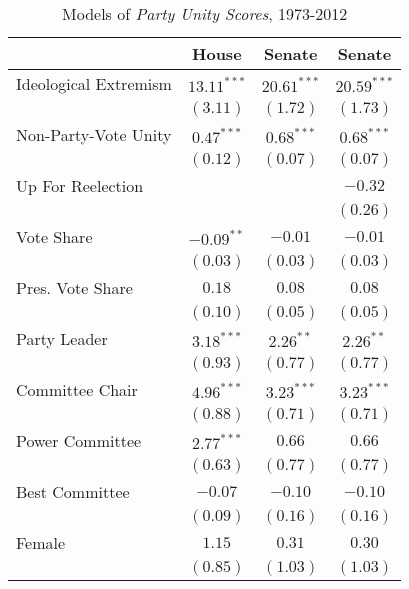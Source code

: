 \documentclass[12pt]{article}
\begin{document}
\begin{table}[!htbp]
\centering
\begin{threeparttable}
\caption{Models of \textit{Party Unity Scores}, 1973-2012}
\label{tab-party-unity-regressions}
\singlespacing
\begin{tabular}{l c c c }
\hline
& House & Senate & Senate \\
\hline
Ideological Extremism & $13.11^{***}$ & $20.61^{***}$ & $20.59^{***}$ \\
                      & $(3.11)$      & $(1.72)$      & $(1.73)$      \\
Non-Party-Vote Unity  & $0.47^{***}$  & $0.68^{***}$  & $0.68^{***}$  \\
                      & $(0.12)$      & $(0.07)$      & $(0.07)$      \\
Up For Reelection     &               &               & $-0.32$       \\
                      &               &               & $(0.26)$      \\
Vote Share            & $-0.09^{**}$  & $-0.01$       & $-0.01$       \\
                      & $(0.03)$      & $(0.03)$      & $(0.03)$      \\
Pres. Vote Share      & $0.18$        & $0.08$        & $0.08$        \\
                      & $(0.10)$      & $(0.05)$      & $(0.05)$      \\
Party Leader          & $3.18^{***}$  & $2.26^{**}$   & $2.26^{**}$   \\
                      & $(0.93)$      & $(0.77)$      & $(0.77)$      \\
Committee Chair       & $4.96^{***}$  & $3.23^{***}$  & $3.23^{***}$  \\
                      & $(0.88)$      & $(0.71)$      & $(0.71)$      \\
Power Committee       & $2.77^{***}$  & $0.66$        & $0.66$        \\
                      & $(0.63)$      & $(0.77)$      & $(0.77)$      \\
Best Committee        & $-0.07$       & $-0.10$       & $-0.10$       \\
                      & $(0.09)$      & $(0.16)$      & $(0.16)$      \\
Female                & $1.15$        & $0.31$        & $0.30$        \\
                      & $(0.85)$      & $(1.03)$      & $(1.03)$      \\

\end{tabular}
\end{threeparttable}
\end{table}
\end{document}
